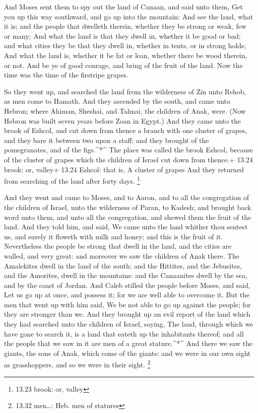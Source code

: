  And Moses sent them to spy out the land of Canaan, and
said unto them, Get you up this way southward, and go up into the
mountain:  And see the land, what it is; and the people
that dwelleth therein, whether they be strong or weak, few or many;
 And what the land is that they dwell in, whether it be
good or bad; and what cities they be that they dwell in, whether in
tents, or in strong holds;  And what the land is, whether
it be fat or lean, whether there be wood therein, or not. And be ye of
good courage, and bring of the fruit of the land. Now the time was the
time of the firstripe grapes.

 So they went up, and searched the land from the wilderness
of Zin unto Rehob, as men come to Hamath.  And they
ascended by the south, and came unto Hebron; where Ahiman, Sheshai, and
Talmai, the children of Anak, were. (Now Hebron was built seven years
before Zoan in Egypt.)  And they came unto the brook of
Eshcol, and cut down from thence a branch with one cluster of grapes,
and they bare it between two upon a staff; and they brought of the
pomegranates, and of the figs.\^{}*\^{}  The place was
called the brook Eshcol, because of the cluster of grapes which the
children of Israel cut down from thence.+ 13.24 brook: or, valley+ 13.24
Eshcol: that is, A cluster of grapes  And they returned
from searching of the land after forty days. \footnote{13.23 brook: or,
  valley}

 And they went and came to Moses, and to Aaron, and to all
the congregation of the children of Israel, unto the wilderness of
Paran, to Kadesh; and brought back word unto them, and unto all the
congregation, and shewed them the fruit of the land.  And
they told him, and said, We came unto the land whither thou sentest us,
and surely it floweth with milk and honey; and this is the fruit of it.
 Nevertheless the people be strong that dwell in the land,
and the cities are walled, and very great: and moreover we saw the
children of Anak there.  The Amalekites dwell in the land
of the south: and the Hittites, and the Jebusites, and the Amorites,
dwell in the mountains: and the Canaanites dwell by the sea, and by the
coast of Jordan.  And Caleb stilled the people before
Moses, and said, Let us go up at once, and possess it; for we are well
able to overcome it.  But the men that went up with him
said, We be not able to go up against the people; for they are stronger
than we.  And they brought up an evil report of the land
which they had searched unto the children of Israel, saying, The land,
through which we have gone to search it, is a land that eateth up the
inhabitants thereof; and all the people that we saw in it are men of a
great stature.\^{}*\^{}  And there we saw the giants, the
sons of Anak, which come of the giants: and we were in our own sight as
grasshoppers, and so we were in their sight. \footnote{13.32 men\ldots:
  Heb. men of statures}


